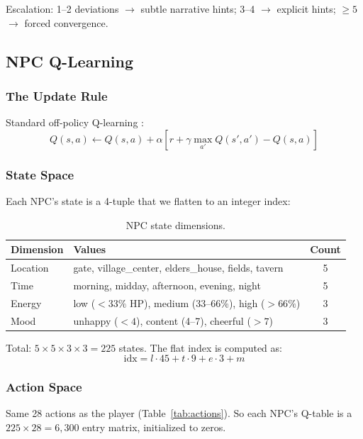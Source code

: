 Escalation: 1--2 deviations $\to$ subtle narrative hints; 3--4 $\to$ explicit hints; $\geq 5$ $\to$ forced convergence.

\subsection{NPC Q-Learning}

\subsubsection{The Update Rule}

Standard off-policy Q-learning \cite{watkins1989learning}:
$$Q(s, a) \leftarrow Q(s, a) + \alpha \left[ r + \gamma \max_{a'} Q(s', a') - Q(s, a) \right]$$

\subsubsection{State Space}

Each NPC's state is a 4-tuple that we flatten to an integer index:

\begin{table}[ht]
\centering
\caption{NPC state dimensions.}
\label{tab:npc_state}
\begin{tabular}{@{}llc@{}}
\toprule
Dimension & Values & Count \\
\midrule
Location & gate, village\_center, elders\_house, fields, tavern & 5 \\
Time & morning, midday, afternoon, evening, night & 5 \\
Energy & low ($<33\%$ HP), medium (33--66\%), high ($>66\%$) & 3 \\
Mood & unhappy ($<4$), content (4--7), cheerful ($>7$) & 3 \\
\bottomrule
\end{tabular}
\end{table}

Total: $5 \times 5 \times 3 \times 3 = 225$ states. The flat index is computed as:
$$\text{idx} = l \cdot 45 + t \cdot 9 + e \cdot 3 + m$$

\subsubsection{Action Space}

Same 28 actions as the player (Table~\ref{tab:actions}). So each NPC's Q-table is a $225 \times 28 = 6{,}300$ entry matrix, initialized to zeros.

